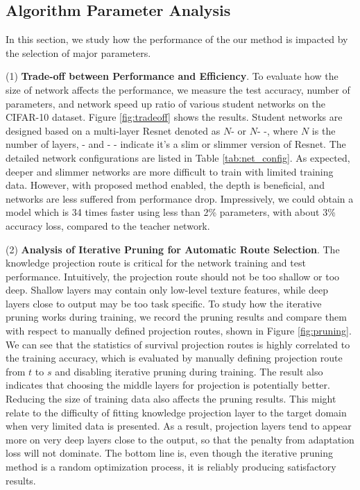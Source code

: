 \documentclass[journal]{IEEEtran}
\begin{document}
\subsection{Algorithm Parameter Analysis}
In this section, we study how the performance of the our method is impacted by the selection of major parameters. 

(1) \textbf{Trade-off between Performance and Efficiency}. To evaluate how the size of network affects the performance, we measure the test accuracy, number of parameters, and network speed up ratio of various student networks on the CIFAR-10 dataset. Figure \ref{fig:tradeoff} shows the results. Student networks are designed based on  a multi-layer Resnet denoted as $N$- or $N$- -, where $N$ is the number of layers, - and - - indicate it's a slim or slimmer version of Resnet. The detailed network configurations are listed in Table \ref{tab:net_config}. As expected, deeper and slimmer networks are more difficult to train with limited training data. However, with proposed method enabled, the depth is beneficial, and networks are less suffered from performance drop. Impressively, we could obtain a model which is 34 times faster using less than 2\% parameters, with about 3\% accuracy loss, compared to the teacher network.

(2) \textbf{Analysis of Iterative Pruning for Automatic Route Selection}. The knowledge projection route is critical for the network training and test performance. Intuitively, the projection route should not be too shallow or too deep. Shallow layers may contain only low-level texture features, while deep layers close to output may be too task specific. To study how the iterative pruning works during training, we record the pruning results and compare them with respect to manually defined projection routes, shown in Figure \ref{fig:pruning}. We can see that the statistics of survival projection routes is highly correlated to the training accuracy, which is evaluated by manually defining projection route from $t$ to $s$ and disabling iterative pruning during training. The result also indicates that choosing the middle layers for projection is potentially better. Reducing the size of training data also affects the pruning results. This might relate to the difficulty of fitting knowledge projection layer to the target domain when very limited data is presented. As a result, projection layers  tend to appear more on very deep layers close to the output, so that the penalty from adaptation loss will not dominate. The bottom line is, even though the iterative pruning method is a random optimization process, it is reliably producing satisfactory results.
\end{document}
